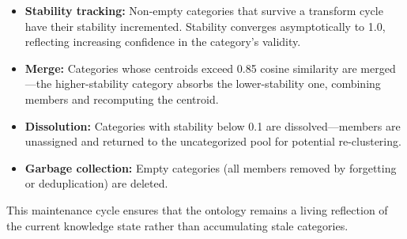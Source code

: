 \begin{itemize}[nosep]
    \item \textbf{Stability tracking:} Non-empty categories that survive a
    transform cycle have their stability incremented. Stability converges
    asymptotically to 1.0, reflecting increasing confidence in the
    category's validity.
    \item \textbf{Merge:} Categories whose centroids exceed 0.85 cosine
    similarity are merged---the higher-stability category absorbs the
    lower-stability one, combining members and recomputing the centroid.
    \item \textbf{Dissolution:} Categories with stability below 0.1
    are dissolved---members are unassigned and returned to the uncategorized
    pool for potential re-clustering.
    \item \textbf{Garbage collection:} Empty categories (all members removed
    by forgetting or deduplication) are deleted.
\end{itemize}

This maintenance cycle ensures that the ontology remains a living reflection
of the current knowledge state rather than accumulating stale categories.
